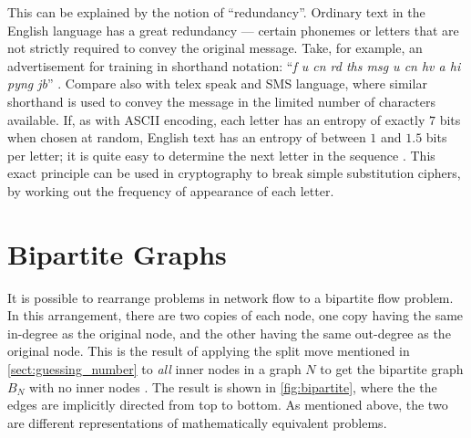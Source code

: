 This can be explained by the notion of ``redundancy''. Ordinary text in the English language has a great redundancy --- certain phonemes or letters that are not strictly required to convey the original message. Take, for example, an advertisement for training in shorthand notation: ``\emph{f u cn rd ths msg u cn hv a hi pyng jb}'' \cite{glei1990}. Compare also with telex speak and SMS language, where similar shorthand is used to convey the message in the limited number of characters available. If, as with ASCII encoding, each letter has an entropy of exactly $7$ bits when chosen at random, English text has an entropy of between $1$ and $1.5$ bits per letter; it is quite easy to determine the next letter in the sequence \cite{schn1996}. This exact principle can be used in cryptography to break simple substitution ciphers, by working out the frequency of appearance of each letter.

\section{Bipartite Graphs}
\label{sect:bipartite}

It is possible to rearrange problems in network flow to a bipartite flow problem. In this arrangement, there are two copies of each node, one copy having the same in-degree as the original node, and the other having the same out-degree as the original node. This is the result of applying the split move mentioned in \autoref{sect:guessing_number} to \emph{all} inner nodes in a graph $N$ to get the bipartite graph $B_N$ with no inner nodes \cite{riis2005util}. The result is shown in \autoref{fig:bipartite}, where the the edges are implicitly directed from top to bottom. As mentioned above, the two are different representations of mathematically equivalent problems.

